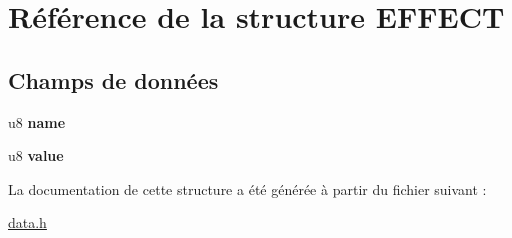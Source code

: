 \hypertarget{struct_e_f_f_e_c_t}{
\section{Référence de la structure EFFECT}
\label{struct_e_f_f_e_c_t}
}
\subsection*{Champs de données}
\begin{DoxyCompactItemize}
\item 
\hypertarget{struct_e_f_f_e_c_t_a9a177c9d0090cd5a668ffd2271075fc4}{
u8 {\bfseries name}}
\label{struct_e_f_f_e_c_t_a9a177c9d0090cd5a668ffd2271075fc4}

\item 
\hypertarget{struct_e_f_f_e_c_t_a9eea2829c6264b2ee423f6eaddcc3fdb}{
u8 {\bfseries value}}
\label{struct_e_f_f_e_c_t_a9eea2829c6264b2ee423f6eaddcc3fdb}

\end{DoxyCompactItemize}


La documentation de cette structure a été générée à partir du fichier suivant :\begin{DoxyCompactItemize}
\item 
\hyperlink{data_8h}{data.h}\end{DoxyCompactItemize}
